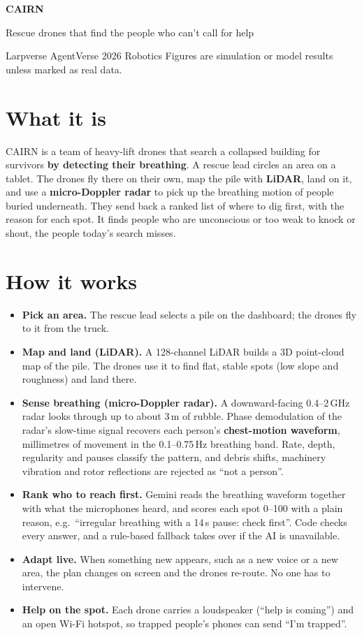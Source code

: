 \documentclass[10pt,a4paper]{extarticle}
\begin{document}
{\LARGE\bfseries\color{cairnblue} CAIRN}\par\vspace{0.2em}
{\large Rescue drones that find the people who can't call for help}\par\vspace{0.1em}
{\small\color{cairngrey} Larpverse \;\textbullet\; AgentVerse 2026 Robotics \;\textbullet\; Figures are simulation or model results unless marked as real data.}

\section*{What it is}
CAIRN is a team of heavy-lift drones that search a collapsed building for survivors \textbf{by detecting their breathing}. A rescue lead circles an area on a tablet. The drones fly there on their own, map the pile with \textbf{LiDAR}, land on it, and use a \textbf{micro-Doppler radar} to pick up the breathing motion of people buried underneath. They send back a ranked list of where to dig first, with the reason for each spot. It finds people who are unconscious or too weak to knock or shout, the people today's search misses.

\section*{How it works}
\begin{itemize}
  \item \textbf{Pick an area.} The rescue lead selects a pile on the dashboard; the drones fly to it from the truck.
  \item \textbf{Map and land (LiDAR).} A 128-channel LiDAR builds a 3D point-cloud map of the pile. The drones use it to find flat, stable spots (low slope and roughness) and land there.
  \item \textbf{Sense breathing (micro-Doppler radar).} A downward-facing 0.4--2\,GHz radar looks through up to about 3\,m of rubble. Phase demodulation of the radar's slow-time signal recovers each person's \textbf{chest-motion waveform}, millimetres of movement in the 0.1--0.75\,Hz breathing band. Rate, depth, regularity and pauses classify the pattern, and debris shifts, machinery vibration and rotor reflections are rejected as ``not a person''.
  \item \textbf{Rank who to reach first.} Gemini reads the breathing waveform together with what the microphones heard, and scores each spot 0--100 with a plain reason, e.g.\ ``irregular breathing with a 14\,s pause: check first''. Code checks every answer, and a rule-based fallback takes over if the AI is unavailable.
  \item \textbf{Adapt live.} When something new appears, such as a new voice or a new area, the plan changes on screen and the drones re-route. No one has to intervene.
  \item \textbf{Help on the spot.} Each drone carries a loudspeaker (``help is coming'') and an open Wi-Fi hotspot, so trapped people's phones can send ``I'm trapped''.
\end{itemize}
\end{document}
